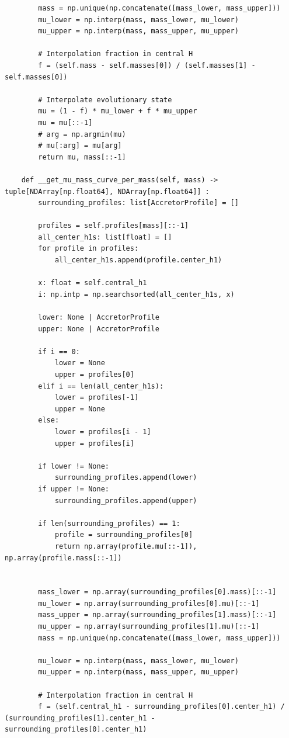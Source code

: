 \documentclass[a4paper,10pt]{article}
\begin{document}
\begin{verbatim}
        mass = np.unique(np.concatenate([mass_lower, mass_upper]))
        mu_lower = np.interp(mass, mass_lower, mu_lower)
        mu_upper = np.interp(mass, mass_upper, mu_upper)

        # Interpolation fraction in central H
        f = (self.mass - self.masses[0]) / (self.masses[1] - self.masses[0])

        # Interpolate evolutionary state
        mu = (1 - f) * mu_lower + f * mu_upper
        mu = mu[::-1]
        # arg = np.argmin(mu)
        # mu[:arg] = mu[arg]
        return mu, mass[::-1]
    
    def __get_mu_mass_curve_per_mass(self, mass) -> tuple[NDArray[np.float64], NDArray[np.float64]] :
        surrounding_profiles: list[AccretorProfile] = []

        profiles = self.profiles[mass][::-1]
        all_center_h1s: list[float] = []
        for profile in profiles:
            all_center_h1s.append(profile.center_h1)

        x: float = self.central_h1
        i: np.intp = np.searchsorted(all_center_h1s, x)

        lower: None | AccretorProfile
        upper: None | AccretorProfile

        if i == 0:
            lower = None
            upper = profiles[0]
        elif i == len(all_center_h1s):
            lower = profiles[-1]
            upper = None
        else:
            lower = profiles[i - 1]
            upper = profiles[i]

        if lower != None:
            surrounding_profiles.append(lower)
        if upper != None:
            surrounding_profiles.append(upper)

        if len(surrounding_profiles) == 1:
            profile = surrounding_profiles[0]
            return np.array(profile.mu[::-1]), np.array(profile.mass[::-1])


        mass_lower = np.array(surrounding_profiles[0].mass)[::-1]
        mu_lower = np.array(surrounding_profiles[0].mu)[::-1]
        mass_upper = np.array(surrounding_profiles[1].mass)[::-1]
        mu_upper = np.array(surrounding_profiles[1].mu)[::-1]
        mass = np.unique(np.concatenate([mass_lower, mass_upper]))

        mu_lower = np.interp(mass, mass_lower, mu_lower)
        mu_upper = np.interp(mass, mass_upper, mu_upper)

        # Interpolation fraction in central H
        f = (self.central_h1 - surrounding_profiles[0].center_h1) / (surrounding_profiles[1].center_h1 - surrounding_profiles[0].center_h1)


\end{verbatim}
\end{document}
